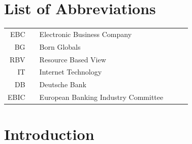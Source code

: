 \documentclass[11pt,a4paper]{article}
\begin{document}
\newpage
\tableofcontents

\newpage

\pagebreak
\listoffigures
\listoftables

\newpage
\section*{List of Abbreviations}

\begin{tabular}{rp{0.2cm}lp{1cm}p{7cm}l}
    EBC     & &  \small Electronic Business Company   & &      \\
    BG    & &  \small Born Globals   & & \\
            RBV     & &  \small Resource Based View  & & \\
                        IT     & &  \small Internet Technology  & & \\
        DB     & &  \small Deutsche Bank  & & \\
                EBIC     & &  \small European Banking Industry Committee  & & \\
\end{tabular}

\captionsetup{justification=justified,singlelinecheck=false}

\pagebreak
{}
\flushbottom
\doublespacing
\parindent=1cm



\section{Introduction}
\label{intro}
\end{document}
